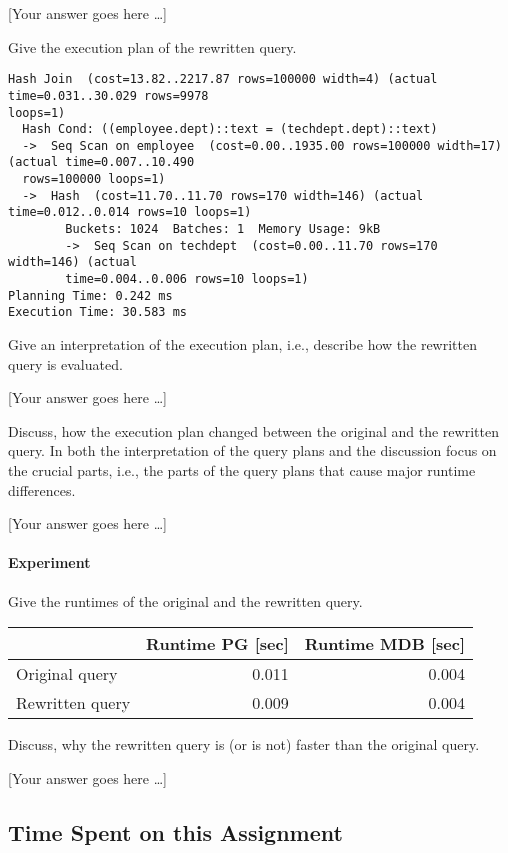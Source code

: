 \documentclass[11pt]{scrartcl}
\newcommand{\youranswerhere}{[Your answer goes here \ldots]}
\begin{document}
    \youranswerhere{}

    Give the execution plan of the rewritten query.

            {\small
    \parskip0pt\begin{verbatim}
Hash Join  (cost=13.82..2217.87 rows=100000 width=4) (actual time=0.031..30.029 rows=9978 
loops=1)
  Hash Cond: ((employee.dept)::text = (techdept.dept)::text)
  ->  Seq Scan on employee  (cost=0.00..1935.00 rows=100000 width=17) (actual time=0.007..10.490 
  rows=100000 loops=1)
  ->  Hash  (cost=11.70..11.70 rows=170 width=146) (actual time=0.012..0.014 rows=10 loops=1)
        Buckets: 1024  Batches: 1  Memory Usage: 9kB
        ->  Seq Scan on techdept  (cost=0.00..11.70 rows=170 width=146) (actual 
        time=0.004..0.006 rows=10 loops=1)
Planning Time: 0.242 ms
Execution Time: 30.583 ms
    \end{verbatim}}

    Give an interpretation of the execution plan, i.e., describe how the rewritten query is evaluated.

    \youranswerhere{}

    Discuss, how the execution plan changed between the original and the rewritten query. In both the interpretation of the query plans and the discussion focus on the crucial parts, i.e., the parts of the query plans that cause major runtime differences.

    \youranswerhere{}

    \paragraph{Experiment}

    Give the runtimes of the original and the rewritten query.

    \begin{table}[H]
        \centering
        \begin{tabular}{l|r|r}
            & Runtime PG [sec] & Runtime MDB [sec] \tabularnewline
            \hline
            Original query & 0.011 & 0.004 \tabularnewline
            Rewritten query & 0.009 & 0.004 \tabularnewline
        \end{tabular}
    \end{table}

    Discuss, why the rewritten query is (or is not) faster than the original query.

    \youranswerhere{}

    \subsection*{Time Spent on this Assignment}
\end{document}
